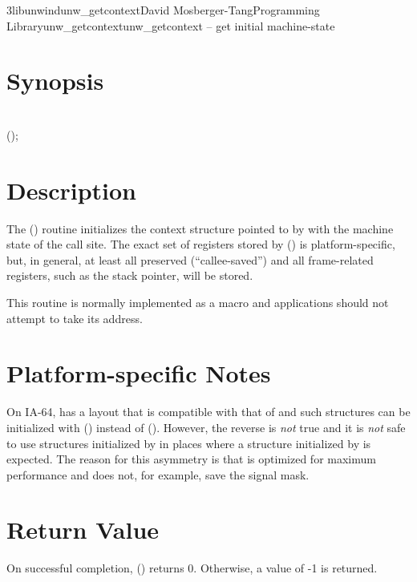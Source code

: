 \documentclass{article}
\begin{document}
\begin{Name}{3libunwind}{unw\_getcontext}{David Mosberger-Tang}{Programming Library}{unw\_getcontext}unw\_getcontext -- get initial machine-state
\end{Name}

\section{Synopsis}

\\

 ();\\

\section{Description}

The () routine initializes the context structure
pointed to by  with the machine state of the call site.  The
exact set of registers stored by () is
platform-specific, but, in general, at least all preserved
(``callee-saved'') and all frame-related registers, such as the
stack pointer, will be stored.

This routine is normally implemented as a macro and applications
should not attempt to take its address.

\section{Platform-specific Notes}

On IA-64,  has a layout that is compatible with
that of  and such structures can be initialized with
() instead of ().  However, the
reverse is \emph{not} true and it is \emph{not} safe to use structures
initialized by  in places where a structure
initialized by  is expected. The reason for this
asymmetry is that  is optimized for maximum
performance and does not, for example, save the signal mask.

\section{Return Value}

On successful completion, () returns 0.
Otherwise, a value of -1 is returned.
\end{document}
